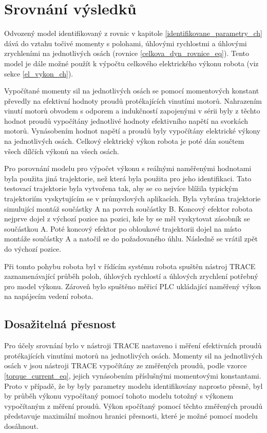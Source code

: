 \chapter{Srovnání výsledků}

Odvozený model identifikovaný z rovnic v kapitole \ref{identifikovane_parametry_ch} dává do vztahu točivé momenty s polohami, úhlovými rychlostmi a úhlovými zrychleními na jednotlivých osách (rovnice \ref{celkova_dyn_rovnice_eq}). Tento model je dále možné použít k výpočtu celkového elektrického výkonu robota (viz sekce \ref{el_vykon_ch}).

Vypočítané momenty sil na jednotlivých osách se pomocí momentových konstant převedly na efektivní hodnoty proudů protékajících vinutími motorů. Nahrazením vinutí motorů obvodem s odporem a indukčností zapojenými v sérii byly z těchto hodnot proudů vypočítány jednotlivé hodnoty efektivního napětí na svorkách motorů. Vynásobením hodnot napětí a proudů byly vypočítány elektrické výkony na jednotlivých osách. Celkový elektrický výkon robota je poté dán součtem všech dílčích výkonů na všech osách. 

Pro porovnání modelu pro výpočet výkonu s reálnými naměřenými hodnotami byla použita jiná trajektorie, než která byla použita pro jeho identifikaci. Tato testovací trajektorie byla vytvořena tak, aby se co nejvíce blížila typickým trajektoriím vyskytujícím se v průmyslových aplikacích. Byla vybrána trajektorie simulující montáž součástky A na povrch součástky B. Koncový efektor robota nejprve dojel z výchozí pozice na pozici, kde by se měl vyskytovat zásobník se součástkou A. Poté koncový efektor po obloukové trajektorii dojel na místo montáže součástky A a natočil se do požadovaného úhlu. Následně se vrátil zpět do výchozí pozice.

Při tomto pohybu robota byl v řídícím systému robota spuštěn nástroj TRACE zaznamenávající průběh poloh, úhlových rychlostí a úhlových zrychlení potřebný pro model výkonu. Zároveň bylo spuštěno měřicí PLC ukládající naměřený výkon na napájecím vedení robota. 

\section{Dosažitelná přesnost}

Pro účely srovnání bylo v nástroji TRACE nastaveno i měření efektivních proudů protékajících vinutími motorů na jednotlivých osách. Momenty sil na jednotlivých osách v jsou nástroji TRACE vypočítány ze změřených proudů, podle vzorce \ref{torque_current_eq}, jejich vynásobením příslušnými momentovými konstantami. Proto v případě, že by byly parametry modelu identifikovány naprosto přesně, byl by průběh výkonu vypočítaný pomocí tohoto modelu totožný s výkonem vypočítaným z měření proudů. Výkon spočítaný pomocí těchto změřených proudů představuje maximální možnou hranici přesnosti, které je možné pomocí modelu dosáhnout. 


